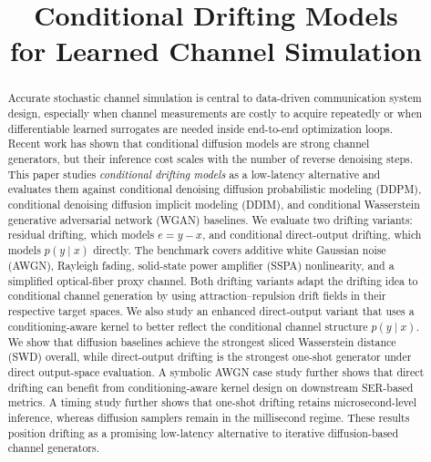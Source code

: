 \documentclass[conference]{IEEEtran}
\title{Conditional Drifting Models \\for Learned Channel Simulation}
\author{
\IEEEauthorblockN{Rick Fritschek and Rafael F. Schaefer\\[1ex]}
\IEEEauthorblockA{Chair of Information Theory and Machine Learning\\ Technische Universität Dresden, Germany%
}
}
\begin{document}
\maketitle

\begin{abstract}
Accurate stochastic channel simulation is central to data-driven communication system design, especially when channel measurements are costly to acquire repeatedly or when differentiable learned surrogates are needed inside end-to-end optimization loops.
Recent work has shown that conditional diffusion models are strong channel generators, but their inference cost scales with the number of reverse denoising steps.
This paper studies \emph{conditional drifting models} as a low-latency alternative and evaluates them against conditional denoising diffusion probabilistic modeling (DDPM), conditional denoising diffusion implicit modeling (DDIM), and conditional Wasserstein generative adversarial network (WGAN) baselines.
We evaluate two drifting variants: residual drifting, which models \(e=y-x\), and conditional direct-output drifting, which models \(p(y\mid x)\) directly.
The benchmark covers additive white Gaussian noise (AWGN), Rayleigh fading, solid-state power amplifier (SSPA) nonlinearity, and a simplified optical-fiber proxy channel.
Both drifting variants adapt the drifting idea to conditional channel generation by using attraction--repulsion drift fields in their respective target spaces. We also study an enhanced direct-output variant that uses a conditioning-aware kernel to better reflect the conditional channel structure \(p(y\mid x)\).
We show that diffusion baselines achieve the strongest sliced Wasserstein distance (SWD) overall, while direct-output drifting is the strongest one-shot generator under direct output-space evaluation. A symbolic AWGN case study further shows that direct drifting can benefit from conditioning-aware kernel design on downstream SER-based metrics.
A timing study further shows that one-shot drifting retains microsecond-level inference, whereas diffusion samplers remain in the millisecond regime.
These results position drifting as a promising low-latency alternative to iterative diffusion-based channel generators.
\end{abstract}

\end{document}
